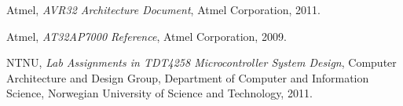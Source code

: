 \begin{thebibliography}{9}

    Atmel,
    \emph{AVR32 Architecture Document},
    Atmel Corporation,
    2011.

    Atmel,
    \emph{AT32AP7000 Reference},
    Atmel Corporation,
    2009.

    NTNU,
    \emph{Lab Assignments in TDT4258 Microcontroller System Design},
    Computer Architecture and Design Group,
    Department of Computer and Information Science,
    Norwegian University of Science and Technology,
    2011.

\end{thebibliography}
